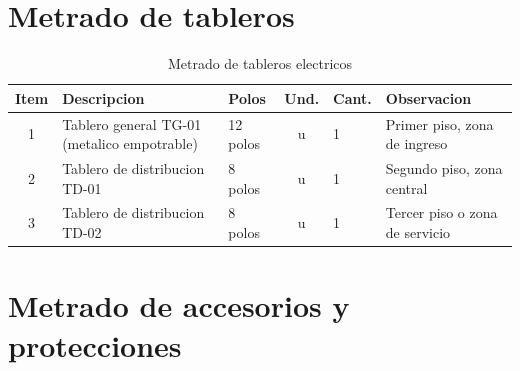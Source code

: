\section{Metrado de tableros}

\begin{table}[H]
\centering
\small
\caption{Metrado de tableros electricos}
\label{tab:metrado-tableros}
\begin{tabularx}{\textwidth}{c L{4.5cm} L{1.8cm} c L{1.8cm} Y}
\toprule
\textbf{Item} & \textbf{Descripcion} & \textbf{Polos} & \textbf{Und.} & \textbf{Cant.} & \textbf{Observacion} \\
 & Tablero general TG-01 (metalico empotrable) & 12 polos & u & 1 & Primer piso, zona de ingreso \\
2 & Tablero de distribucion TD-01 & 8 polos & u & 1 & Segundo piso, zona central \\
3 & Tablero de distribucion TD-02 & 8 polos & u & 1 & Tercer piso o zona de servicio \\
\bottomrule
\end{tabularx}
\end{table}

\section{Metrado de accesorios y protecciones}

